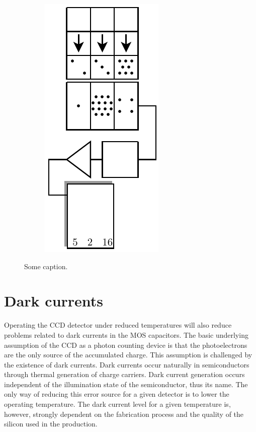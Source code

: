 \begin{figure}[htpb]
\begin{subfigure}[t]{0.25\textwidth}
		\caption{}
		\label{fig:ccd-registry-5}
	\end{subfigure}%
	\begin{subfigure}[t]{0.25\textwidth}
		\centering
		\includegraphics[scale=1.0]{ccd-registry-6.pdf}
		\caption{}
		\label{fig:ccd-registry-6}
	\end{subfigure}
	\caption{Some caption.}
	\label{fig:ccd-registry}
\end{figure}

\section{Dark currents}

Operating the CCD detector under reduced temperatures will also reduce
problems related to dark currents in the MOS capacitors. The basic
underlying assumption of the CCD as a photon counting device is that
the photoelectrons are the only source of the accumulated charge. This
assumption is challenged by the existence of dark currents. Dark
currents occur naturally in semiconductors through thermal generation
of charge carriers. Dark current generation occurs independent of the
illumination state of the semiconductor, thus its name. The only way
of reducing this error source for a given detector is to lower the
operating temperature. The dark current level for a given temperature
is, however, strongly dependent on the fabrication process and the
quality of the silicon used in the production.

